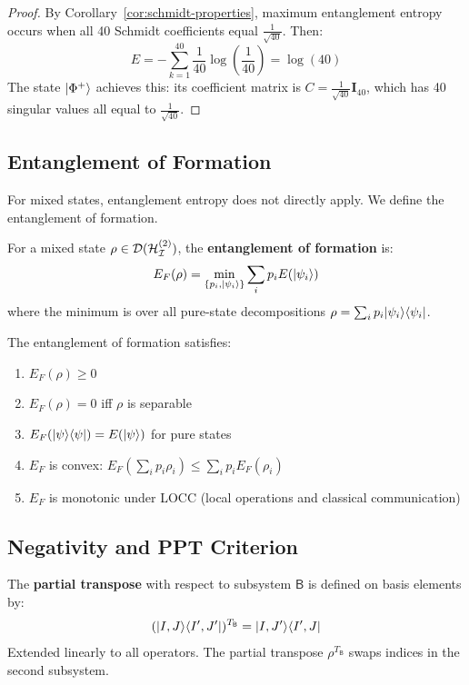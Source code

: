 \begin{proof}
By Corollary~\ref{cor:schmidt-properties}, maximum entanglement entropy occurs when all 40 Schmidt coefficients equal $\frac{1}{\sqrt{40}}$. Then:
\[
E = -\sum_{k=1}^{40} \frac{1}{40} \log\left(\frac{1}{40}\right) = \log(40)
\]
The state $|\Phi^+\rangle$ achieves this: its coefficient matrix is $C = \frac{1}{\sqrt{40}} \mathbf{I}_{40}$, which has 40 singular values all equal to $\frac{1}{\sqrt{40}}$.
\end{proof}

\subsection{Entanglement of Formation}

For mixed states, entanglement entropy does not directly apply. We define the entanglement of formation.

\begin{definition}
\label{def:eof}
For a mixed state $\rho \in \mathcal{D}(\mathcal{H}_{\mathcal{I}}^{(2)})$, the \textbf{entanglement of formation} is:
\[
E_F(\rho) = \min_{\{p_i, |\psi_i\rangle\}} \sum_i p_i E(|\psi_i\rangle)
\]
where the minimum is over all pure-state decompositions $\rho = \sum_i p_i |\psi_i\rangle\langle \psi_i|$.
\end{definition}

\begin{proposition}
\label{prop:eof-props}
The entanglement of formation satisfies:
\begin{enumerate}
  \item $E_F(\rho) \geq 0$
  \item $E_F(\rho) = 0$ iff $\rho$ is separable
  \item $E_F(|\psi\rangle\langle \psi|) = E(|\psi\rangle)$ for pure states
  \item $E_F$ is convex: $E_F(\sum_i p_i \rho_i) \leq \sum_i p_i E_F(\rho_i)$
  \item $E_F$ is monotonic under LOCC (local operations and classical communication)
\end{enumerate}
\end{proposition}

\subsection{Negativity and PPT Criterion}

\begin{definition}
\label{def:partial-transpose}
The \textbf{partial transpose} with respect to subsystem $\mathsf{B}$ is defined on basis elements by:
\[
(|I, J\rangle\langle I', J'|)^{T_\mathsf{B}} = |I, J'\rangle\langle I', J|
\]
Extended linearly to all operators. The partial transpose $\rho^{T_\mathsf{B}}$ swaps indices in the second subsystem.
\end{definition}

